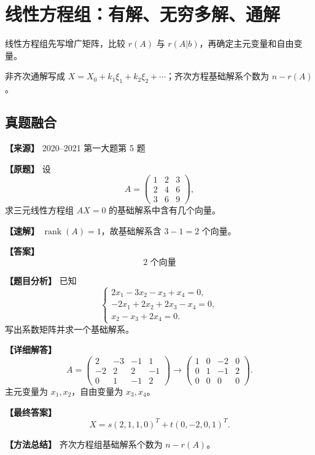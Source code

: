 \documentclass[11pt,a4paper,UTF8]{ctexart}
\newcommand{\rank}{\operatorname{rank}}
\begin{document}
\section{线性方程组：有解、无穷多解、通解}

\begin{identifybox}[识别]
线性方程组先写增广矩阵，比较 $r(A)$ 与 $r(A|b)$，再确定主元变量和自由变量。
\end{identifybox}
\begin{templatebox}[考场模板]
非齐次通解写成 $X=X_0+k_1\xi_1+k_2\xi_2+\cdots$；齐次方程基础解系个数为 $n-r(A)$。
\end{templatebox}

\subsection{真题融合}

\begin{answerbox}
\textbf{【来源】} 2020--2021 第一大题第 5 题

\textbf{【原题】}
设
\[
A=\begin{pmatrix}1&2&3\\2&4&6\\3&6&9\end{pmatrix},
\]
求三元线性方程组 $AX=0$ 的基础解系中含有几个向量。

\textbf{【速解】}
$\rank(A)=1$，故基础解系含 $3-1=2$ 个向量。

\textbf{【答案】}
\[2\text{ 个向量}\]
\end{answerbox}

\begin{answerbox}
\textbf{【题目分析】} 已知
\[
\begin{cases}
2x_1-3x_2-x_3+x_4=0,\\
-2x_1+2x_2+2x_3-x_4=0,\\
x_2-x_3+2x_4=0.
\end{cases}
\]
写出系数矩阵并求一个基础解系。

\textbf{【详细解答】}
\[
A=\begin{pmatrix}
2&-3&-1&1\\
-2&2&2&-1\\
0&1&-1&2
\end{pmatrix}
\to
\begin{pmatrix}
1&0&-2&0\\
0&1&-1&2\\
0&0&0&0
\end{pmatrix}.
\]
主元变量为 $x_1,x_2$，自由变量为 $x_3,x_4$。

\textbf{【最终答案】}
\[
X=s(2,1,1,0)^T+t(0,-2,0,1)^T.
\]

\textbf{【方法总结】} 齐次方程组基础解系个数为 $n-r(A)$。
\end{answerbox}
\end{document}
